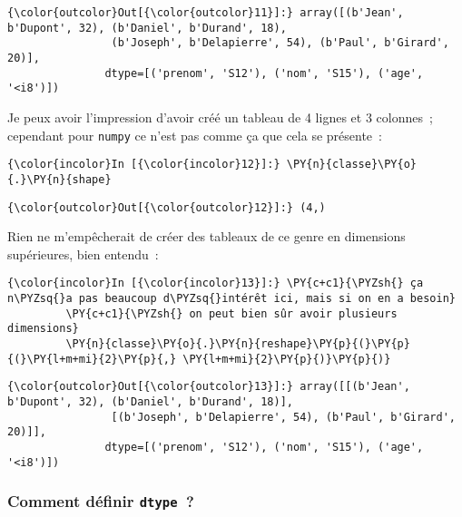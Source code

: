\begin{Verbatim}[commandchars=\\\{\}]
{\color{outcolor}Out[{\color{outcolor}11}]:} array([(b'Jean', b'Dupont', 32), (b'Daniel', b'Durand', 18),
                (b'Joseph', b'Delapierre', 54), (b'Paul', b'Girard', 20)],
               dtype=[('prenom', 'S12'), ('nom', 'S15'), ('age', '<i8')])
\end{Verbatim}
            
    Je peux avoir l'impression d'avoir créé un tableau de 4 lignes et 3
colonnes~; cependant pour \texttt{numpy} ce n'est pas comme ça que cela
se présente~:

    \begin{Verbatim}[commandchars=\\\{\}]
{\color{incolor}In [{\color{incolor}12}]:} \PY{n}{classe}\PY{o}{.}\PY{n}{shape}
\end{Verbatim}


\begin{Verbatim}[commandchars=\\\{\}]
{\color{outcolor}Out[{\color{outcolor}12}]:} (4,)
\end{Verbatim}
            
    Rien ne m'empêcherait de créer des tableaux de ce genre en dimensions
supérieures, bien entendu~:

    \begin{Verbatim}[commandchars=\\\{\}]
{\color{incolor}In [{\color{incolor}13}]:} \PY{c+c1}{\PYZsh{} ça n\PYZsq{}a pas beaucoup d\PYZsq{}intérêt ici, mais si on en a besoin}
         \PY{c+c1}{\PYZsh{} on peut bien sûr avoir plusieurs dimensions}
         \PY{n}{classe}\PY{o}{.}\PY{n}{reshape}\PY{p}{(}\PY{p}{(}\PY{l+m+mi}{2}\PY{p}{,} \PY{l+m+mi}{2}\PY{p}{)}\PY{p}{)}
\end{Verbatim}


\begin{Verbatim}[commandchars=\\\{\}]
{\color{outcolor}Out[{\color{outcolor}13}]:} array([[(b'Jean', b'Dupont', 32), (b'Daniel', b'Durand', 18)],
                [(b'Joseph', b'Delapierre', 54), (b'Paul', b'Girard', 20)]],
               dtype=[('prenom', 'S12'), ('nom', 'S15'), ('age', '<i8')])
\end{Verbatim}
            
    \hypertarget{comment-duxe9finir-dtype}{%
\subsubsection{\texorpdfstring{Comment définir
\texttt{dtype}~?}{Comment définir dtype~?}}\label{comment-duxe9finir-dtype}}

